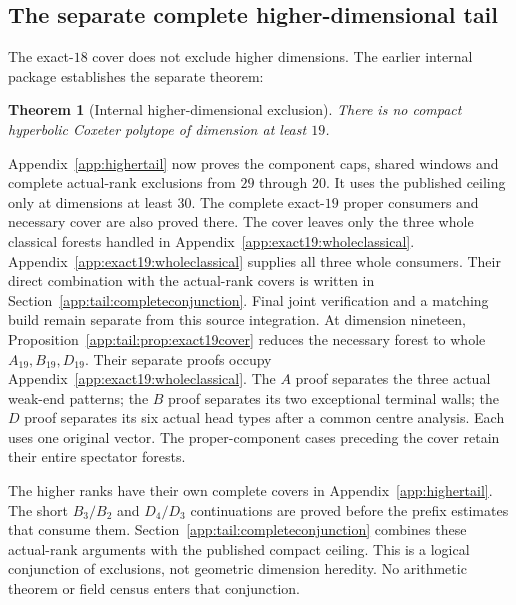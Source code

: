 \documentclass[11pt]{article}
\newtheorem{theorem}{Theorem}[section]
\theoremstyle{definition}
\theoremstyle{remark}
\begin{document}
\subsection{The separate complete higher-dimensional tail}
\label{subsec:higher}
The exact-\(18\) cover does not exclude higher dimensions.
The earlier internal package establishes the separate theorem:
\begin{theorem}[Internal higher-dimensional exclusion]
\label{thm:tail}
There is no compact hyperbolic Coxeter polytope of dimension at least \(19\).
\end{theorem}
Appendix~\ref{app:highertail} now proves the component caps, shared
windows and complete actual-rank exclusions from \(29\) through \(20\).
It uses the published ceiling only at dimensions at least \(30\).
The complete exact-\(19\) proper consumers and necessary cover are
also proved there. The cover leaves only the three whole classical
forests handled in Appendix~\ref{app:exact19:wholeclassical}.
Appendix~\ref{app:exact19:wholeclassical} supplies all three whole
consumers. Their direct combination with the actual-rank covers is
written in Section~\ref{app:tail:completeconjunction}. Final joint
verification and a matching build remain separate from this source
integration.
At dimension nineteen, Proposition~\ref{app:tail:prop:exact19cover}
reduces the necessary forest to whole \(A_{19},B_{19},D_{19}\).
Their separate proofs occupy Appendix~\ref{app:exact19:wholeclassical}.
The \(A\) proof separates the three actual weak-end patterns; the
\(B\) proof separates its two exceptional terminal walls; the \(D\)
proof separates its six actual head types after a common centre analysis.
Each uses one original vector. The proper-component cases preceding
the cover retain their entire spectator forests.

The higher ranks have their own complete covers in
Appendix~\ref{app:highertail}. The short \(B_3/B_2\) and \(D_4/D_3\)
continuations are proved before the prefix estimates that consume them.
Section~\ref{app:tail:completeconjunction} combines these actual-rank
arguments with the published compact ceiling. This is a logical
conjunction of exclusions, not geometric dimension heredity.
No arithmetic theorem or field census enters that conjunction.
\end{document}

